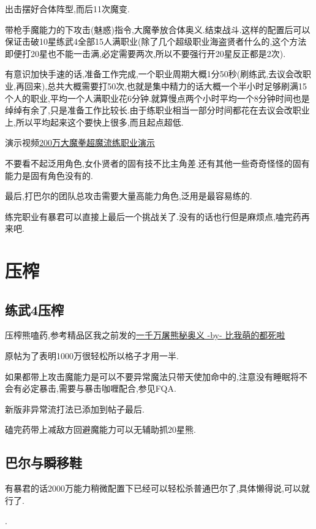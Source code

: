 		出击摆好合体阵型,而后11次魔变.

		带枪手魔能力的下攻击(魅惑)指令,大魔拳放合体奥义.结束战斗.这样的配置后可以保证击破10星练武4全部15人满职业(除了几个超级职业海盗贤者什么的,这个方法即便打20星也不能一击满,必定需要两次,所以不要强行开20星反正都是2次).

		有意识加快手速的话,准备工作完成,一个职业周期大概1分50秒(刷练武,去议会改职业,再回来),总共大概需要打50次,也就是集中精力的话大概一个半小时足够刷满15个人的职业,平均一个人满职业花6分钟.就算慢点两个小时平均一个8分钟时间也是绰绰有余了,只是准备工作比较长.由于练职业相当一部分时间都花在去议会改职业上,所以平均起来这个要快上很多,而且起点超低.

		演示视频\href{http://www.bilibili.com/video/av2966618/}{200万大魔拳超魔流练职业演示}

		不要看不起泛用角色,女仆贤者的固有技不比主角差.还有其他一些奇奇怪怪的固有能力是固有角色没有的.

		最后,打巴尔的团队总攻击需要大量高能力角色,泛用是最容易练的.

		练完职业有暴君可以直接上最后一个挑战关了.没有的话也行但是麻烦点,嗑完药再来吧.

	\newpage

	\section{压榨}

		\subsection{练武4压榨}

		压榨熊嗑药,参考精品区我之前发的\href{http://tieba.baidu.com/p/3825275063}{一千万屠熊秘奥义 -by- 比我萌的都死啦}

		原帖为了表明1000万很轻松所以格子才用一半.

		如果都带上攻击魔能力是可以不要异常魔法只带天使加命中的,注意没有睡眠将不会有必定暴击,需要与暴击咖喱配合,参见FQA.

		新版非异常流打法已添加到帖子最后.

		磕完药带上减敌方回避魔能力可以无辅助抓20星熊.

		\subsection{巴尔与瞬移鞋}

		有暴君的话2000万能力稍微配置下已经可以轻松杀普通巴尔了,具体懒得说,可以就行了.

		{\color{red}{即便没有这里也建议用2000万能力挑战下,整个游戏挑战关已经没几个了,如果觉得困难可以参考后面修罗篇的巴尔攻略}}.

